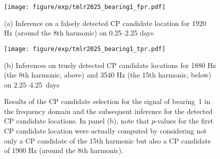 \begin{figure}[t]
  \centering
  \begin{minipage}[t]{0.4\hsize}
    \centering
    \texttt{[image: figure/exp/tmlr2025\_bearing1\_fpr.pdf]}
    \caption*{(a) Inference on a falsely detected CP candidate location for 1920 Hz (around the 8th harmonic) on 0.25--2.25 days}
  \end{minipage}
  \hfill
  \begin{minipage}[t]{0.4\hsize}
    \centering
    \texttt{[image: figure/exp/tmlr2025\_bearing1\_tpr.pdf]}
    \caption*{(b) Inferences on truely detected CP candidate locations for 1880 Hz (the 8th harmonic, above) and 3540 Hz (the 15th harmonic, below) on 2.25--4.25~days}
  \end{minipage}
  \caption{Results of the CP candidate selection for the signal of bearing~1 in the frequency domain and the subsequent inference for the detected CP candidate locations.
  In panel (b), note that $p$-values for the first CP candidate location were actually computed by considering not only a CP candidate of the 15th harmonic but also a CP candidate of 1900 Hz (around the 8th harmonic).}
  \label{fig_bearing1}
\end{figure}
